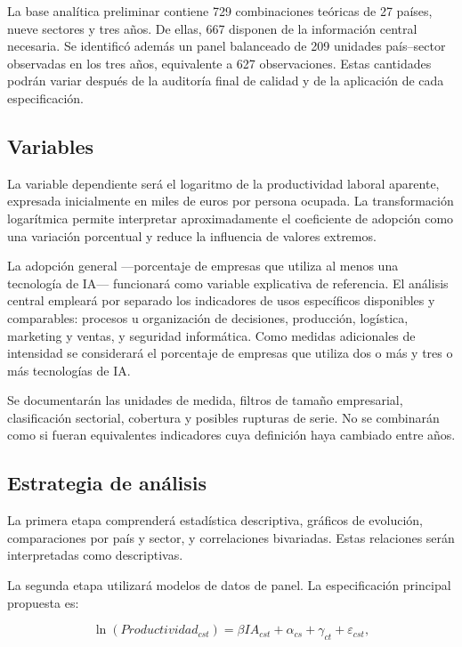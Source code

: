 \documentclass[12pt,a4paper]{article}
\begin{document}
La base analítica preliminar contiene 729 combinaciones teóricas de 27 países, nueve sectores y tres años. De ellas, 667 disponen de la información central necesaria. Se identificó además un panel balanceado de 209 unidades país--sector observadas en los tres años, equivalente a 627 observaciones. Estas cantidades podrán variar después de la auditoría final de calidad y de la aplicación de cada especificación.

\subsection{Variables}

La variable dependiente será el logaritmo de la productividad laboral aparente, expresada inicialmente en miles de euros por persona ocupada. La transformación logarítmica permite interpretar aproximadamente el coeficiente de adopción como una variación porcentual y reduce la influencia de valores extremos.

La adopción general ---porcentaje de empresas que utiliza al menos una tecnología de IA--- funcionará como variable explicativa de referencia. El análisis central empleará por separado los indicadores de usos específicos disponibles y comparables: procesos u organización de decisiones, producción, logística, marketing y ventas, y seguridad informática. Como medidas adicionales de intensidad se considerará el porcentaje de empresas que utiliza dos o más y tres o más tecnologías de IA.

Se documentarán las unidades de medida, filtros de tamaño empresarial, clasificación sectorial, cobertura y posibles rupturas de serie. No se combinarán como si fueran equivalentes indicadores cuya definición haya cambiado entre años.

\subsection{Estrategia de análisis}

La primera etapa comprenderá estadística descriptiva, gráficos de evolución, comparaciones por país y sector, y correlaciones bivariadas. Estas relaciones serán interpretadas como descriptivas.

La segunda etapa utilizará modelos de datos de panel. La especificación principal propuesta es:

\begin{equation}
 \ln(Productividad_{cst}) =
 \beta IA_{cst} + \alpha_{cs} + \gamma_{ct} + \varepsilon_{cst},
\end{equation}
\end{document}
